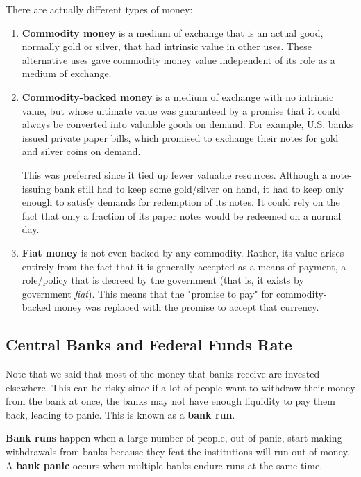 \documentclass{article}
\begin{document}
    \begin{definition}
      There are actually different types of money: 
      \begin{enumerate}
        \item \textbf{Commodity money} is a medium of exchange that is an actual good, normally gold or silver, that had intrinsic value in other uses. These alternative uses gave commodity money value independent of its role as a medium of exchange. 

        \item \textbf{Commodity-backed money} is a medium of exchange with no intrinsic value, but whose ultimate value was guaranteed by a promise that it could always be converted into valuable goods on demand. For example, U.S. banks issued private paper bills, which promised to exchange their notes for gold and silver coins on demand. 
        
        This was preferred since it tied up fewer valuable resources. Although a note-issuing bank still had to keep some gold/silver on hand, it had to keep only enough to satisfy demands for redemption of its notes. It could rely on the fact that only a fraction of its paper notes would be redeemed on a normal day. 

        \item \textbf{Fiat money} is not even backed by any commodity. Rather, its value arises entirely from the fact that it is generally accepted as a means of payment, a role/policy that is decreed by the government (that is, it exists by government \textit{fiat}). This means that the "promise to pay" for commodity-backed money was replaced with the promise to accept that currency. 
      \end{enumerate}
    \end{definition}

  \subsection{Central Banks and Federal Funds Rate} 

    Note that we said that most of the money that banks receive are invested elsewhere. This can be risky since if a lot of people want to withdraw their money from the bank at once, the banks may not have enough liquidity to pay them back, leading to panic. This is known as a \textbf{bank run}. 

    \begin{definition}
      \textbf{Bank runs} happen when a large number of people, out of panic, start making withdrawals from banks because they feat the institutions will run out of money. A \textbf{bank panic} occurs when multiple banks endure runs at the same time. 
    \end{definition}
\end{document}
